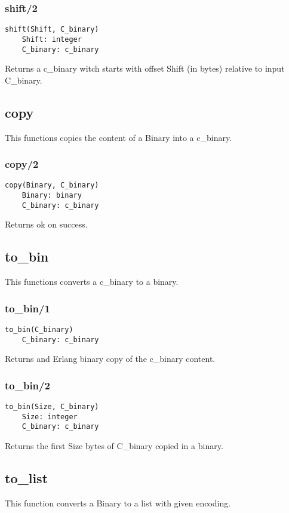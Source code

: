 \documentclass{article}
\begin{document}
    \subsubsection{shift/2}
        \begin{verbatim}
shift(Shift, C_binary)
    Shift: integer
    C_binary: c_binary
        \end{verbatim}
        Returns a c\_binary witch starts with offset Shift (in bytes) relative to input C\_binary.
    
    \subsection{copy}
    This functions copies the content of a Binary into a c\_binary.
    \subsubsection{copy/2}
        \begin{verbatim}
copy(Binary, C_binary)
    Binary: binary
    C_binary: c_binary
        \end{verbatim}
        Returns ok on success.
        
    \subsection{to\_bin}
    This functions converts a c\_binary to a binary.
    \subsubsection{to\_bin/1}
         \begin{verbatim}
to_bin(C_binary)
    C_binary: c_binary
        \end{verbatim}
        Returns and Erlang binary copy of the c\_binary content.

    \subsubsection{to\_bin/2}
         \begin{verbatim}
to_bin(Size, C_binary)
    Size: integer
    C_binary: c_binary
        \end{verbatim}
        Returns the first Size bytes of C\_binary copied in a binary.
    
    
    \subsection{to\_list}
    This function converts a Binary to a list with given encoding.
\end{document}
